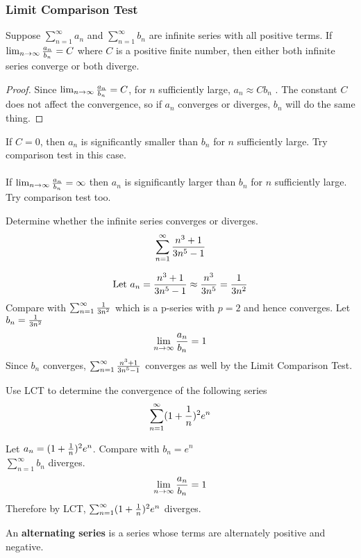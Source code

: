\documentclass[english, 12pt]{article}
\begin{document}
\subsubsection{Limit Comparison Test}
Suppose $\sum_{n=1}^\infty a_{n}$ and $\sum_{n=1}^\infty b_{n}$ are infinite series with all positive terms. If $\lim_{n\to\infty} \frac{a_{n}}{b_{n}} = C$ where $C$ is a positive finite number, then either both infinite series converge or both diverge.
\begin{proof}
Since $\lim_{n\to\infty} \frac{a_{n}}{b_{n}} = C$, for $n$ sufficiently large, $a_{n} \approx C b_{n}$ . The constant $C$ does not affect the convergence, so if $a_{n}$ converges or diverges, $b_{n}$ will do the same thing.
\end{proof}
\begin{rem}
If $C=0$, then $a_{n}$ is significantly smaller than $b_{n}$ for $n$ sufficiently large. Try comparison test in this case.\\\\
If $\lim_{n\to\infty} \frac{a_{n}}{b_{n}} = \infty$ then $a_{n}$ is significantly larger than $b_{n}$ for $n$ sufficiently large. Try comparison test too.
\end{rem}
\begin{exmp}
Determine whether the infinite series  converges or diverges.
\[ \sum_{n=1}^\infty \frac{n^3+1}{3n^5 - 1} \]
\begin{sol}
\[\text{Let }a_{n} =\frac{n^3+1}{3n^5 - 1} \approx \frac{n^3}{3n^5} = \frac{1}{3n^2} \]
Compare with $\sum_{n=1}^\infty \frac{1}{3n^2}$ which is a p-series with $p=2$ and hence converges. Let $b_{n} = \frac{1}{3n^2}$
\[\lim_{n\to\infty} \frac{a_{n}}{b_{n}} = 1 \]
Since $b_{n}$ converges, $\sum_{n=1}^\infty \frac{n^3+1}{3n^5 - 1}$ converges as well by the Limit Comparison Test.

\end{sol}
\end{exmp}
\begin{exmp}
Use LCT to determine the convergence of the following series
\[\sum_{n=1}^\infty (1+\frac{1}{n})^2 e^n \]
\begin{sol}
Let $a_{n} =(1+\frac{1}{n})^2 e^n $. Compare with $b_{n} =e^n$\\
$\sum_{n=1}^\infty b_{n}$ diverges.
\[\lim_{n\to\infty} \frac{a_{n}}{b_{n}} = 1\]
Therefore by LCT, $\sum_{n=1}^\infty (1+\frac{1}{n})^2 e^n$ diverges.
\end{sol}
\end{exmp}
\begin{defn}
An \textbf{alternating series} is a series whose terms are alternately positive and negative.
\end{defn}
\end{document}
